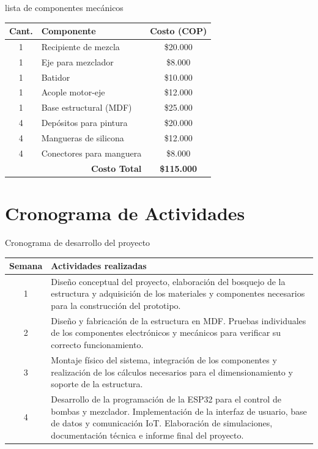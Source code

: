 \documentclass[conference]{IEEEtran}
\begin{document}
\begin{table}[ht]
{lista de componentes mec\'anicos}
\label{tab:costos_mecanicos}
\centering
\footnotesize
\renewcommand{\arraystretch}{2.0}
\begin{tabular}{|c|l|c|}
\hline
\textbf{Cant.} & \textbf{Componente} & \textbf{Costo (COP)} \\
\hline
1 & Recipiente de mezcla & \$20.000 \\
\hline
1 & Eje para mezclador & \$8.000 \\
\hline
1 & Batidor & \$10.000 \\
\hline
1 & Acople motor-eje & \$12.000 \\
\hline
1 & Base estructural (MDF) & \$25.000 \\
\hline
4 & Dep\'ositos para pintura & \$20.000 \\
\hline
4 & Mangueras de silicona & \$12.000 \\
\hline
4 & Conectores para manguera & \$8.000 \\
\hline
\multicolumn{2}{|r|}{\textbf{Costo Total}} & \textbf{\$115.000} \\
\hline
\end{tabular}
\end{table}

\section{Cronograma de Actividades}

\begin{table}[ht]
{Cronograma de desarrollo del proyecto}
\label{tab:cronograma}
\centering
\footnotesize
\renewcommand{\arraystretch}{1.2}
\begin{tabular}{|c|p{7cm}|}
\hline
\textbf{Semana} & \textbf{Actividades realizadas} \\
\hline
1 &
Dise\~no conceptual del proyecto, elaboraci\'on del bosquejo de la estructura y adquisici\'on de los materiales y componentes necesarios para la construcci\'on del prototipo. \\
\hline
2 &
Dise\~no y fabricaci\'on de la estructura en MDF. Pruebas individuales de los componentes electr\'onicos y mec\'anicos para verificar su correcto funcionamiento. \\
\hline
3 &
Montaje f\'isico del sistema, integraci\'on de los componentes y realizaci\'on de los c\'alculos necesarios para el dimensionamiento y soporte de la estructura. \\
\hline
4 &
Desarrollo de la programaci\'on de la ESP32 para el control de bombas y mezclador. Implementaci\'on de la interfaz de usuario, base de datos y comunicaci\'on IoT. Elaboraci\'on de simulaciones, documentaci\'on t\'ecnica e informe final del proyecto. \\
\hline
\end{tabular}
\end{table}
\end{document}
